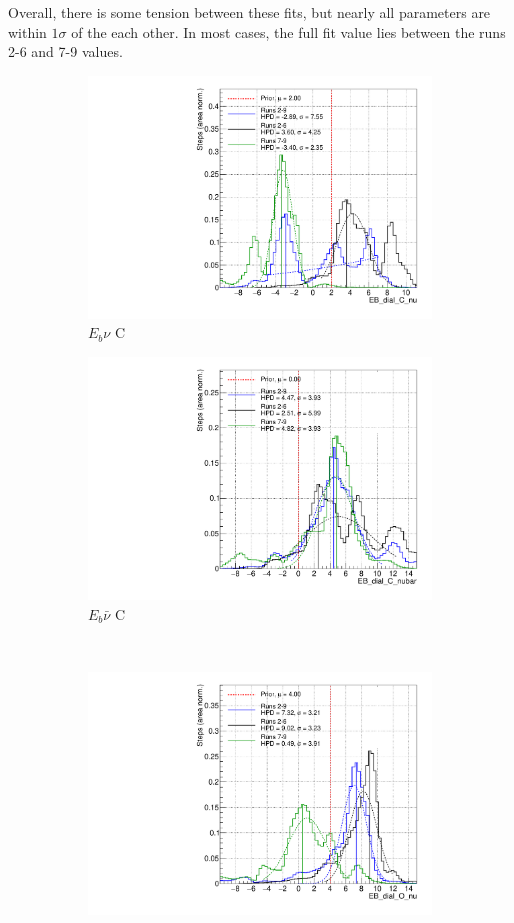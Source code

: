 Overall, there is some tension between these fits, but nearly all parameters are within $1\sigma$ of the each other. In most cases, the full fit value lies between the runs 2-6 and 7-9 values.

\begin{figure}
\centering
\begin{subfigure}{.48\textwidth}
  \centering
  \includegraphics[width=0.73\linewidth]{figs/Runs_EB_dial_C_nu}
  \caption{$E_{b}\nu$ C}
\end{subfigure}
\begin{subfigure}{.48\textwidth}
  \centering
  \includegraphics[width=0.73\linewidth]{figs/Runs_EB_dial_C_nubar}
  \caption{$E_{b}\bar{\nu}$ C}
\end{subfigure} \\
\begin{subfigure}{.48\textwidth}
  \centering
  \includegraphics[width=0.73\linewidth]{figs/Runs_EB_dial_O_nu}

\end{subfigure}
\end{figure}

